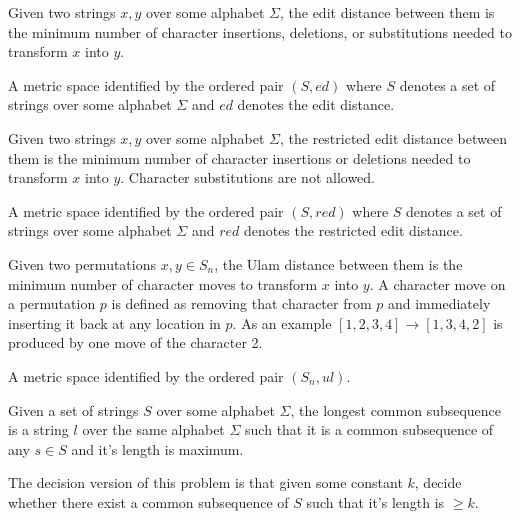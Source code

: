 \begin{definition}
\label{Edit Distance}
    Given two strings $x, y$ over some alphabet $\Sigma$, the edit distance between them is the minimum number of character insertions, deletions, or substitutions needed to transform $x$ into $y$.
\end{definition}

\begin{definition}
\label{Edit Metric}
    A metric space identified by the ordered pair $(S, ed)$ where $S$ denotes a set of strings over some alphabet $\Sigma$ and $ed$ denotes the edit distance.
\end{definition}

\begin{definition}
    Given two strings $x, y$ over some alphabet $\Sigma$, the restricted edit distance between them is the minimum number of character insertions or deletions needed to transform $x$ into $y$. Character substitutions are not allowed.
\end{definition}

\begin{definition}
\label{RestrictedMetric}
    A metric space identified by the ordered pair $(S, red)$ where $S$ denotes a set of strings over some alphabet $\Sigma$ and $red$ denotes the restricted edit distance.
\end{definition}

\begin{definition}
\label{Ulam Distance}
    Given two permutations $x, y \in S_n$, the Ulam distance between them is the minimum number of character moves to transform $x$ into $y$. A character move on a permutation $p$ is defined as removing that character from $p$ and immediately inserting it back at any location in $p$. As an example $[1, 2, 3, 4] \rightarrow [1, 3, 4, 2]$ is produced by one move of the character 2.
\end{definition}

\begin{definition}
\label{Ulam Metric}
    A metric space identified by the ordered pair $(S_n, ul)$.
\end{definition}

\begin{definition}
    Given a set of strings $S$ over some alphabet $\Sigma$, the longest common subsequence is a string $l$ over the same alphabet $\Sigma$ such that it is a common subsequence of any $s \in S$ and it's length is maximum. 
    
    The decision version of this problem is that given some constant $k$, decide whether there exist a common subsequence of $S$ such that it's length is $\geq k$.
\end{definition}

